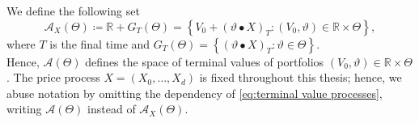 \documentclass[11pt,a4paper,twoside,openany]{report}
\theoremstyle{plain} %
\theoremstyle{definition} %
\theoremstyle{remark} %
\begin{document}
We define the following set
\begin{equation}\label{eq:terminal value processes}
    \mathcal{A}_X(\Theta)\coloneqq \mathbb{R}+G_T(\Theta)=\left\{V_0+(\vartheta \bullet X)_T:(V_0,\vartheta)\in\mathbb{R}\times \Theta\right\},
\end{equation}
where \(T\) is the final time and \(G_T(\Theta)=\left\{(\vartheta \bullet X)_T:\vartheta\in \Theta\right\}\).\\
Hence, \(\mathcal{A}(\Theta)\) defines the space of terminal values of portfolios \((V_0,\vartheta)\in\mathbb{R}\times \Theta\). The price process \(X=(X_0,\dots,X_d)\) is fixed throughout this thesis; hence, we abuse notation by omitting the dependency of \cref{eq:terminal value processes}, writing \(\mathcal{A}(\Theta)\) instead of \(\mathcal{A}_X(\Theta)\).
\end{document}
